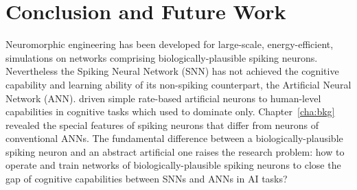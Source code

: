 \chapter{Conclusion and Future Work}
\label{cha:conc}
Neuromorphic engineering has been developed for large-scale, energy-efficient, simulations on networks comprising \DIFdelbegin {}\DIFdelend biologically-plausible spiking neurons.
Nevertheless the Spiking Neural Network (SNN) has not achieved the cognitive capability and learning ability of its non-spiking counterpart, the Artificial Neural Network (ANN).
\DIFdelbegin {}\DIFdelend \DIFaddbegin {}\DIFaddend driven simple rate-based artificial neurons to \DIFdelbegin {}\DIFdelend \DIFaddbegin {}\DIFaddend human-level capabilities in cognitive tasks which \DIFdelbegin {}\DIFdelend \DIFaddbegin {}\DIFaddend used to dominate only. 
\DIFdelbegin {}\DIFdelend Chapter~\ref{cha:bkg} \DIFdelbegin {}\DIFdelend revealed the special features of spiking neurons that differ from \DIFaddbegin {}\DIFaddend neurons of conventional ANNs.
The fundamental difference between a biologically-plausible spiking neuron and an abstract artificial one raises the research problem: how to operate and train networks of biologically-plausible spiking neurons to close the gap of cognitive capabilities between SNNs and ANNs in AI tasks?

